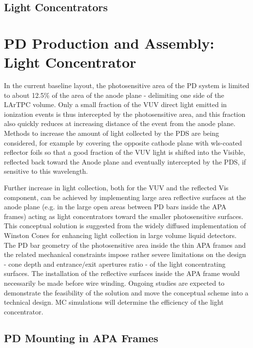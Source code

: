 \subsection{Light Concentrators}
\label{sec:fdsp-pd-assy-lc}
	
\section{PD Production and Assembly: Light Concentrator}
In the current baseline layout, the photosensitive area of the PD system is limited to about 12.5\% of the area of the anode plane - delimiting one side of the LArTPC volume. 
Only a small fraction of the VUV direct light emitted in ionization events is thus intercepted by the photosensitive area, and this fraction also 
 quickly reduces at increasing distance of the event from the anode plane. \\
Methods to increase the amount of light collected by the PDS are being considered, for example by covering the opposite cathode plane with wls-coated reflector foils so that a good fraction of the VUV light is shifted into the Visible, reflected back toward the Anode plane and eventually intercepted by the PDS, if sensitive to this wavelength.

Further increase in light collection, both for the VUV and the reflected Vis component, can be achieved by implementing large area reflective surfaces 
at the anode plane (e.g. in the large open areas between PD bars inside the APA frames) acting as light concentrators toward the smaller photosensitive surfaces.  
This conceptual solution is suggested from the widely diffused implementation of Winston Cones for enhancing light collection in large volume liquid detectors. 
The PD bar geometry of the photosensitive area inside the thin APA frames and the related mechanical constraints impose rather severe limitations 
on the design - cone depth and entrance$/$exit apertures ratio - of the light concentrating surfaces. The installation of the reflective surfaces inside the APA frame would necessarily be made before wire winding. 
Ongoing studies are expected to demonstrate the feasibility of the solution and move the conceptual scheme into a technical design. MC simulations will determine the efficiency of the light concentrator. 




\subsection{PD Mounting in APA Frames}
\label{sec:fdsp-pd-assy-frames}

